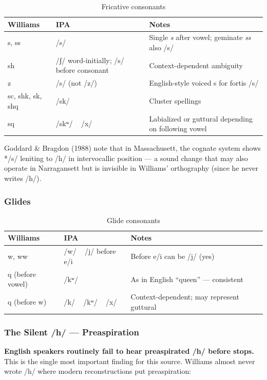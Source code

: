 \begin{table}[h]
\centering
\begin{tabular}{lll}
\toprule
Williams & IPA & Notes \\
\midrule
s, ss & /s/ & Single \textit{s} after vowel; geminate \textit{ss} also /s/ \\
sh & /ʃ/ word-initially; /s/ before consonant & Context-dependent ambiguity \\
z & /s/ (not /z/) & English-style voiced s for fortis /s/ \\
sc, shk, sk, shq & /sk/ & Cluster spellings \\
sq & /skʷ/ ~ /x/ & Labialized or guttural depending on following vowel \\
\bottomrule
\end{tabular}
\caption{Fricative consonants}
\label{tab:1362-fricatives}
\end{table}

Goddard \& Bragdon (1988) note that in Massachusett, the cognate system shows
*/s/ leniting to /h/ in intervocallic position --- a sound change that may
also operate in Narragansett but is invisible in Williams' orthography (since
he never writes /h/).

\subsubsection{Glides}

\begin{table}[h]
\centering
\begin{tabular}{lll}
\toprule
Williams & IPA & Notes \\
\midrule
w, ww & /w/ ~ /j/ before e/i & Before e/i can be /j/ (yes) \\
q (before vowel) & /kʷ/ & As in English ``queen'' --- consistent \\
q (before w) & /k/ ~ /kʷ/ ~ /x/ & Context-dependent; may represent guttural \\
\bottomrule
\end{tabular}
\caption{Glide consonants}
\label{tab:1362-glides}
\end{table}

\subsubsection{The Silent /h/ --- Preaspiration}

\textbf{English speakers routinely fail to hear preaspirated /h/ before stops.}
This is the single most important finding for this source. Williams almost
never wrote /h/ where modern reconstructions put preaspiration:

